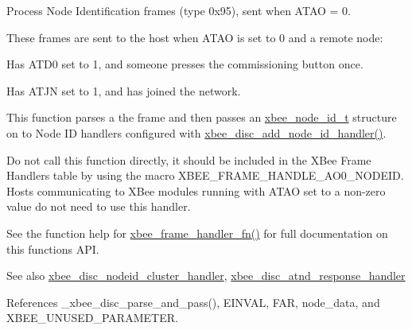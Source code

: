 Process Node Identification frames (type 0x95), sent when A\+T\+AO = 0. 

These frames are sent to the host when A\+T\+AO is set to 0 and a remote node\+:
\begin{DoxyItemize}
\item Has A\+T\+D0 set to 1, and someone presses the commissioning button once.
\item Has A\+T\+JN set to 1, and has joined the network.
\end{DoxyItemize}

This function parses a the frame and then passes an \hyperlink{structxbee__node__id__t}{xbee\+\_\+node\+\_\+id\+\_\+t} structure on to Node ID handlers configured with \hyperlink{group__xbee__discovery_ga59a0294fbcb1b9f43b8436d4ec3a5a9e}{xbee\+\_\+disc\+\_\+add\+\_\+node\+\_\+id\+\_\+handler()}.

Do not call this function directly, it should be included in the X\+Bee Frame Handlers table by using the macro X\+B\+E\+E\+\_\+\+F\+R\+A\+M\+E\+\_\+\+H\+A\+N\+D\+L\+E\+\_\+\+A\+O0\+\_\+\+N\+O\+D\+E\+ID. Hosts communicating to X\+Bee modules running with A\+T\+AO set to a non-\/zero value do not need to use this handler.

See the function help for \hyperlink{group__xbee__device_ga3e6f2b540e8cec7a69ef0b0166da14ff}{xbee\+\_\+frame\+\_\+handler\+\_\+fn()} for full documentation on this function\textquotesingle{}s A\+PI.

\begin{DoxySeeAlso}{See also}
\hyperlink{group__xbee__discovery_ga20bc82e8efc243e295c99c23948bed3b}{xbee\+\_\+disc\+\_\+nodeid\+\_\+cluster\+\_\+handler}, \hyperlink{group__xbee__discovery_ga6d1190133ded980a4eeca2034508c8a5}{xbee\+\_\+disc\+\_\+atnd\+\_\+response\+\_\+handler} 
\end{DoxySeeAlso}


References \+\_\+xbee\+\_\+disc\+\_\+parse\+\_\+and\+\_\+pass(), E\+I\+N\+V\+AL, F\+AR, node\+\_\+data, and X\+B\+E\+E\+\_\+\+U\+N\+U\+S\+E\+D\+\_\+\+P\+A\+R\+A\+M\+E\+T\+ER.

\mbox{\label{group__xbee__discovery_ga091ae347ddae0bd1b54948714e9d6933}} 
